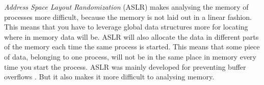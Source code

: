\textit{Address Space Layout Randomization} (ASLR) makes analysing the memory 
of processes more difficult, because the memory is not laid out in a linear 
fashion. This means that you have to leverage global data structures more for
locating where in memory data will be. ASLR will also allocate the data in 
different parts of the memory each time the same process is started. This means
that some piece of data, belonging to one process,  will not be in the same 
place in memory every time you start the process. ASLR was mainly developed for 
preventing buffer overflows \cite{prot_aslr}. But it also makes it more difficult
to analysing memory.\\





%
%

